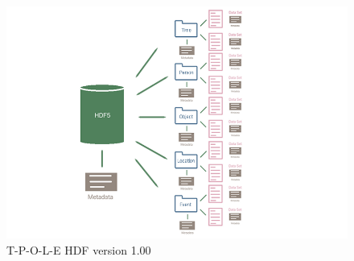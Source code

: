 \begin{figure}[H]
    \centering
    \includegraphics[width=14cm]{figures/technical/HDF5_TPOLE.png}
    \caption{T-P-O-L-E HDF version 1.00}
    \label{fig:figHDF5TPOLE}
\end{figure}
